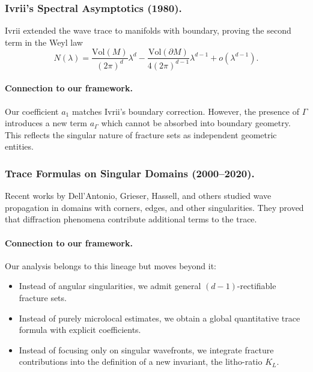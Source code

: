 \subsubsection{Ivrii’s Spectral Asymptotics (1980).}
Ivrii \cite{Ivrii1980} extended the wave trace to manifolds with
boundary, proving the second term in the Weyl law
\[
N(\lambda) = \frac{\mathrm{Vol}(M)}{(2\pi)^d}\lambda^d
- \frac{\mathrm{Vol}(\partial M)}{4(2\pi)^{d-1}}\lambda^{d-1} + o(\lambda^{d-1}).
\]

\paragraph{Connection to our framework.}
Our coefficient $a_1$ matches Ivrii’s boundary correction.
However, the presence of $\Gamma$ introduces a new term $a_\Gamma$
which cannot be absorbed into boundary geometry. This reflects the
singular nature of fracture sets as independent geometric entities.


\subsubsection{Trace Formulas on Singular Domains (2000–2020).}
Recent works by Dell’Antonio, Grieser, Hassell, and others
\cite{DellAntonio2006, Grieser2010, Hassell2017} studied wave
propagation in domains with corners, edges, and other singularities.
They proved that diffraction phenomena contribute additional terms
to the trace.

\paragraph{Connection to our framework.}
Our analysis belongs to this lineage but moves beyond it:
\begin{itemize}
\item Instead of angular singularities, we admit general
$(d-1)$-rectifiable fracture sets.
\item Instead of purely microlocal estimates, we obtain a
global quantitative trace formula with explicit coefficients.
\item Instead of focusing only on singular wavefronts,
we integrate fracture contributions into the definition of a new
invariant, the litho-ratio $K_L$.
\end{itemize}

